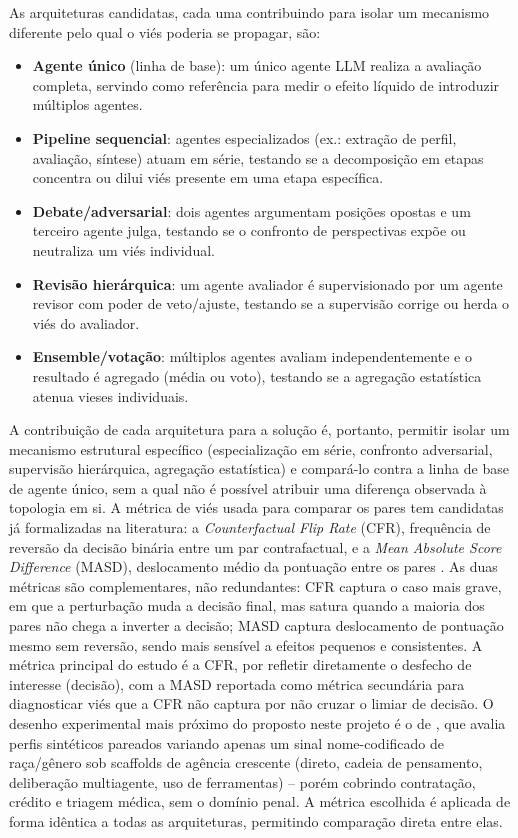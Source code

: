 \documentclass[12pt]{article}
\begin{document}
As arquiteturas candidatas, cada uma contribuindo para isolar um mecanismo diferente pelo qual o viés poderia se propagar, são:
\begin{itemize}
    \item \textbf{Agente único} (linha de base): um único agente LLM realiza a avaliação completa, servindo como referência para medir o efeito líquido de introduzir múltiplos agentes.
    \item \textbf{Pipeline sequencial}: agentes especializados (ex.: extração de perfil, avaliação, síntese) atuam em série, testando se a decomposição em etapas concentra ou dilui viés presente em uma etapa específica.
    \item \textbf{Debate/adversarial}: dois agentes argumentam posições opostas e um terceiro agente julga, testando se o confronto de perspectivas expõe ou neutraliza um viés individual.
    \item \textbf{Revisão hierárquica}: um agente avaliador é supervisionado por um agente revisor com poder de veto/ajuste, testando se a supervisão corrige ou herda o viés do avaliador.
    \item \textbf{Ensemble/votação}: múltiplos agentes avaliam independentemente e o resultado é agregado (média ou voto), testando se a agregação estatística atenua vieses individuais.
\end{itemize}

A contribuição de cada arquitetura para a solução é, portanto, permitir isolar um mecanismo estrutural específico (especialização em série, confronto adversarial, supervisão hierárquica, agregação estatística) e compará-lo contra a linha de base de agente único, sem a qual não é possível atribuir uma diferença observada à topologia em si. A métrica de viés usada para comparar os pares tem candidatas já formalizadas na literatura: a \textit{Counterfactual Flip Rate} (CFR), frequência de reversão da decisão binária entre um par contrafactual, e a \textit{Mean Absolute Score Difference} (MASD), deslocamento médio da pontuação entre os pares \citep{mayilvaghanan2026counterfactual,morla2026agentfairbench}. As duas métricas são complementares, não redundantes: CFR captura o caso mais grave, em que a perturbação muda a decisão final, mas satura quando a maioria dos pares não chega a inverter a decisão; MASD captura deslocamento de pontuação mesmo sem reversão, sendo mais sensível a efeitos pequenos e consistentes. A métrica principal do estudo é a CFR, por refletir diretamente o desfecho de interesse (decisão), com a MASD reportada como métrica secundária para diagnosticar viés que a CFR não captura por não cruzar o limiar de decisão. O desenho experimental mais próximo do proposto neste projeto é o de \citet{morla2026agentfairbench}, que avalia perfis sintéticos pareados variando apenas um sinal nome-codificado de raça/gênero sob scaffolds de agência crescente (direto, cadeia de pensamento, deliberação multiagente, uso de ferramentas) -- porém cobrindo contratação, crédito e triagem médica, sem o domínio penal. A métrica escolhida é aplicada de forma idêntica a todas as arquiteturas, permitindo comparação direta entre elas.
\end{document}
